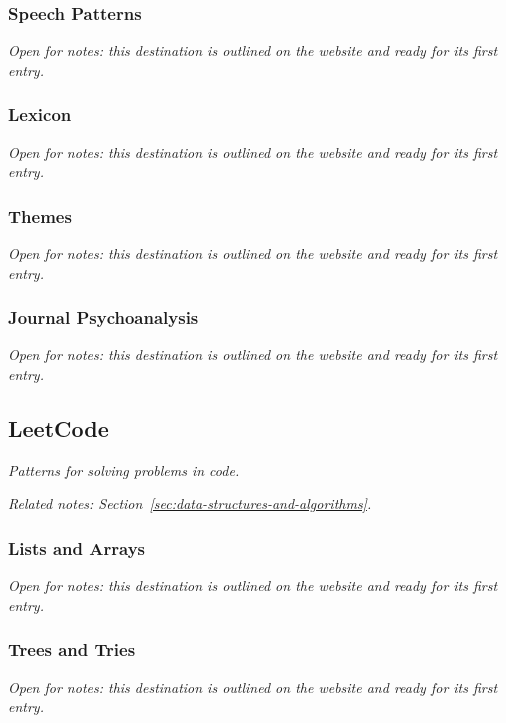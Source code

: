\documentclass{article}
\begin{document}
\subsubsection{Speech Patterns}\label{sec:speech-patterns}
\textit{Open for notes: this destination is outlined on the website and ready for its first entry.}

\subsubsection{Lexicon}\label{sec:lexicon}
\textit{Open for notes: this destination is outlined on the website and ready for its first entry.}

\subsubsection{Themes}\label{sec:themes}
\textit{Open for notes: this destination is outlined on the website and ready for its first entry.}

\subsubsection{Journal Psychoanalysis}\label{sec:journal-psychoanalysis}
\textit{Open for notes: this destination is outlined on the website and ready for its first entry.}

\subsection{LeetCode}\label{sec:leetcode}
\textit{Patterns for solving problems in code.}

\textit{Related notes: Section~\ref{sec:data-structures-and-algorithms}.}

\subsubsection{Lists and Arrays}\label{sec:lists-and-arrays}
\textit{Open for notes: this destination is outlined on the website and ready for its first entry.}

\subsubsection{Trees and Tries}\label{sec:trees-and-tries}
\textit{Open for notes: this destination is outlined on the website and ready for its first entry.}
\end{document}
